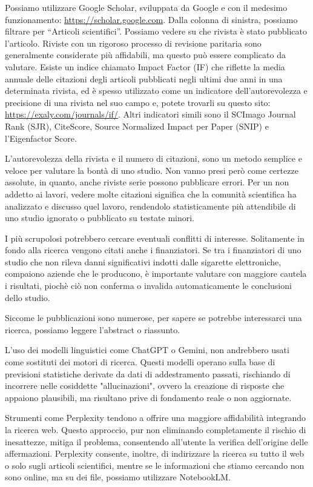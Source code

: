 \documentclass[12pt]{book} %
\begin{document}
Possiamo utilizzare Google Scholar, sviluppata da Google e con il medesimo funzionamento: \url{https://scholar.google.com}.
Dalla colonna di sinistra, possiamo filtrare per “Articoli scientifici”.
Possiamo vedere su che rivista è stato pubblicato l'articolo. Riviste con un rigoroso processo di revisione paritaria sono generalmente considerate più affidabili, ma questo può essere complicato da valutare. Esiste un indice chiamato Impact Factor (IF) che riflette la media annuale delle citazioni degli articoli pubblicati negli ultimi due anni in una determinata rivista, ed è spesso utilizzato come un indicatore dell'autorevolezza e precisione di una rivista nel suo campo e, potete trovarli su questo sito: \url{https://exaly.com/journals/if/}.
Altri indicatori simili sono il SCImago Journal Rank (SJR), CiteScore, Source Normalized Impact per Paper (SNIP) e l'Eigenfactor Score.

L'autorevolezza della rivista e il numero di citazioni, sono un metodo semplice e veloce per valutare la bontà di uno studio. Non vanno presi però come certezze assolute, in quanto, anche riviste serie possono pubblicare errori. Per un non addetto ai lavori, vedere molte citazioni significa che la comunità scientifica ha analizzato e discusso quel lavoro, rendendolo statisticamente più attendibile di uno studio ignorato o pubblicato su testate minori.

I più scrupolosi potrebbero cercare eventuali conflitti di interesse. Solitamente in fondo alla ricerca vengono citati anche i finanziatori. Se tra i finanziatori di uno studio che non rileva danni significativi indotti dalle sigarette elettroniche, compaiono aziende che le producono, è importante valutare con maggiore cautela i risultati, piochè ciò non conferma o invalida automaticamente le conclusioni dello studio.

Siccome le pubblicazioni sono numerose, per sapere se potrebbe interessarci una ricerca, possiamo leggere l'abstract o riassunto.

L'uso dei modelli linguistici come ChatGPT o Gemini, non andrebbero usati come sostituti dei motori di ricerca. Questi modelli operano sulla base di previsioni statistiche derivate da dati di addestramento passati, rischiando di incorrere nelle cosiddette "allucinazioni", ovvero la creazione di risposte che appaiono plausibili, ma risultano prive di fondamento reale o non aggiornate. 

Strumenti come Perplexity tendono a offrire una maggiore affidabilità integrando la ricerca web. Questo approccio, pur non eliminando completamente il rischio di inesattezze, mitiga il problema, consentendo all'utente la verifica dell'origine delle affermazioni.
Perplexity consente, inoltre, di indirizzare la ricerca su tutto il web o solo sugli articoli scientifici, mentre se le informazioni che stiamo cercando non sono online, ma su dei file, possiamo utilizzare NotebookLM.
\end{document}
